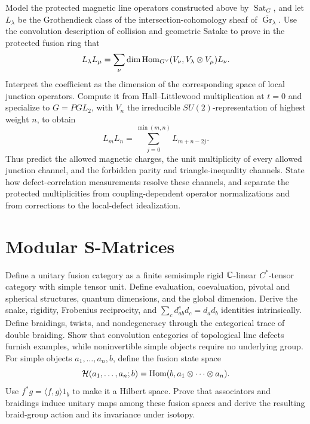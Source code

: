 \begin{exercise}
Model the protected magnetic line operators constructed above by
$\operatorname{Sat}_G$, and let $L_\lambda$ be the Grothendieck class of the
intersection-cohomology sheaf of
$\overline{\operatorname{Gr}}_\lambda$.  Use the convolution description of
collision and geometric Satake to prove in the protected fusion ring that
\[
 L_\lambda L_\mu=\sum_\nu
 \dim\operatorname{Hom}_{G^\vee}(V_\nu,V_\lambda\otimes V_\mu)L_\nu.
\]
Interpret the coefficient as the dimension of the corresponding space of
local junction operators.  Compute it from Hall--Littlewood multiplication at
$t=0$ and specialize to $G=PGL_2$, with $V_n$ the irreducible
$SU(2)$-representation of highest weight $n$, to obtain
\[
 L_mL_n=\sum_{j=0}^{\min(m,n)}L_{m+n-2j}.
\]
Thus predict the allowed magnetic charges, the unit multiplicity of every
allowed junction channel, and the forbidden parity and triangle-inequality
channels.  State how defect-correlation measurements resolve these channels,
and separate the protected multiplicities from coupling-dependent operator
normalizations and from corrections to the local-defect idealization.
\end{exercise}

\section{Modular S-Matrices}

\begin{exercise}
Define a unitary fusion category as a finite semisimple rigid
$\mathbb C$-linear $C^*$-tensor category with simple tensor unit.  Define evaluation,
coevaluation, pivotal and spherical structures, quantum dimensions, and the
global dimension.  Derive the snake, rigidity, Frobenius reciprocity, and
$\sum_cd_{ab}^cd_c=d_ad_b$ identities intrinsically.  Define braidings,
twists, and nondegeneracy through the categorical trace of double braiding.
Show that convolution categories of topological line defects furnish
examples, while noninvertible simple objects require no underlying group.
For simple objects $a_1,\ldots,a_n,b$, define the fusion state space
\[
 \mathcal H(a_1,\ldots,a_n;b)
 =\operatorname{Hom}(b,a_1\otimes\cdots\otimes a_n).
\]
Use $f^*g=\langle f,g\rangle1_b$ to make it a Hilbert space.  Prove that
associators and braidings induce unitary maps among these fusion spaces and
derive the resulting braid-group action and its invariance under isotopy.
\end{exercise}

